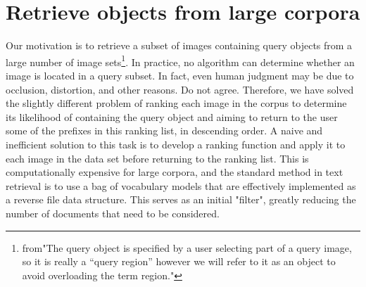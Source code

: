 \documentclass[a4paper,12pt]{article}
\begin{document}
\section{ Retrieve objects from large corpora}
	Our motivation is to retrieve a subset of images containing query objects from a large number of image sets\footnote{from"The query object is speciﬁed by a user selecting part of a query image, so it is really a “query region” however we will refer to it as an object to avoid overloading the term region."}. In practice, no algorithm can determine whether an image is located in a query subset. In fact, even human judgment may be due to occlusion, distortion, and other reasons. Do not agree. Therefore, we have solved the slightly different problem of ranking each image in the corpus to determine its likelihood of containing the query object and aiming to return to the user some of the prefixes in this ranking list, in descending order. A naive and inefficient solution to this task is to develop a ranking function and apply it to each image in the data set before returning to the ranking list. This is computationally expensive for large corpora, and the standard method in text retrieval is to use a bag of vocabulary models that are effectively implemented as a reverse file data structure. This serves as an initial "filter", greatly reducing the number of documents that need to be considered.
\end{document}

